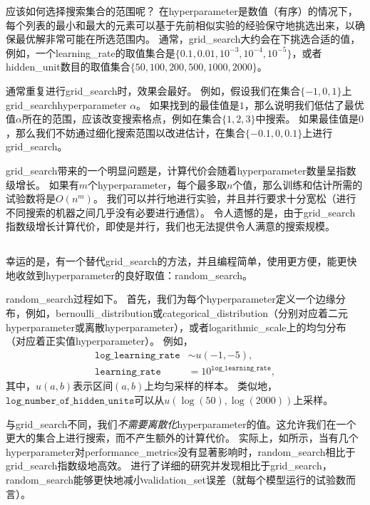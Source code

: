 应该如何选择搜索集合的范围呢？
在\gls{hyperparameter}是数值（有序）的情况下，每个列表的最小和最大的元素可以基于先前相似实验的经验保守地挑选出来，以确保最优解非常可能在所选范围内。
通常，\gls{grid_search}大约会在下挑选合适的值，例如，一个\gls{learning_rate}的取值集合是$\{0.1,0.01,10^{-3},10^{-4},10^{-5}\}$，或者\gls{hidden_unit}数目的取值集合$\{50,100,200,500,1000,2000\}$。


通常重复进行\gls{grid_search}时，效果会最好。
例如，假设我们在集合$\{-1,0,1\}$上\gls{grid_search}\gls{hyperparameter} $\alpha$。
如果找到的最佳值是$1$，那么说明我们低估了最优值$\alpha$所在的范围，应该改变搜索格点，例如在集合$\{1,2,3\}$中搜索。
如果最佳值是$0$，那么我们不妨通过细化搜索范围以改进估计，在集合$\{-0.1,0,0.1\}$上进行\gls{grid_search}。


\gls{grid_search}带来的一个明显问题是，计算代价会随着\gls{hyperparameter}数量呈指数级增长。
如果有$m$个\gls{hyperparameter}，每个最多取$n$个值，那么训练和估计所需的试验数将是$O(n^m)$。
我们可以并行地进行实验，并且并行要求十分宽松（进行不同搜索的机器之间几乎没有必要进行通信）。
令人遗憾的是，由于\gls{grid_search}指数级增长计算代价，即使是并行，我们也无法提供令人满意的搜索规模。


\subsection{}
\label{sec:random_search}
幸运的是，有一个替代\gls{grid_search}的方法，并且编程简单，使用更方便，能更快地收敛到\gls{hyperparameter}的良好取值：\gls{random_search}\citep{Bergstra+Bengio-2012-small}。


\gls{random_search}过程如下。
首先，我们为每个\gls{hyperparameter}定义一个边缘分布，例如，\gls{bernoulli_distribution}或\gls{categorical_distribution}（分别对应着二元\gls{hyperparameter}或离散\gls{hyperparameter}），或者\gls{logarithmic_scale}上的均匀分布（对应着正实值\gls{hyperparameter}）。
例如，
\begin{align}
	\texttt{log\_learning\_rate} &\sim u(-1, -5), \\
	\texttt{learning\_rate} &= 10^{\texttt{log\_learning\_rate}},
\end{align}
其中，$u(a,b)$表示区间$(a,b)$上均匀采样的样本。
类似地，$\texttt{log\_number\_of\_hidden\_units}$可以从$u(\log(50), \log(2000))$上采样。


与\gls{grid_search}不同，我们\emph{不需要离散化}\gls{hyperparameter}的值。这允许我们在一个更大的集合上进行搜索，而不产生额外的计算代价。%
实际上，如所示，当有几个\gls{hyperparameter}对\gls{performance_metrics}没有显著影响时，\gls{random_search}相比于\gls{grid_search}指数级地高效。
\cite{Bergstra+Bengio-2012-small}进行了详细的研究并发现相比于\gls{grid_search}， \gls{random_search}能够更快地减小\gls{validation_set}误差（就每个模型运行的试验数而言）。

